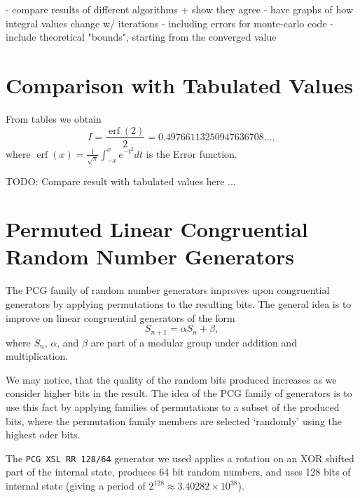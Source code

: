 \documentclass[10pt, a4paper]{article}
\begin{document}
- compare results of different algorithms + show they agree
- have graphs of how integral values change w/ iterations
  - including errors for monte-carlo code
  - include theoretical "bounds", starting from the converged value

{}


\appendix{}

\section{Comparison with Tabulated Values}
\label{app:cheat}
From tables we obtain
\begin{equation}
I = \frac{\operatorname{erf}(2)}{2} = 0.49766113250947636708 \dots,
\end{equation}
where $\operatorname{erf}(x) = \frac{1}{\sqrt\pi}\int_{-x}^x e^{-t^2} dt$ is the Error function.

TODO: Compare result with tabulated values here ...

\section{Permuted Linear Congruential Random Number Generators}
\label{app:pcg}

The PCG family of random number generators improves upon congruential generators by applying
permutations to the resulting bits\cite{pcg}. The general idea is to improve on linear congruential
generators of the form
\begin{equation}
S_{n+1} = \alpha S_n + \beta,
\end{equation}
where $S_n$, $\alpha$, and $\beta$ are part of a modular group under addition and multiplication.

We may notice, that the quality of the random bits produced increases as we consider higher bits
in the result\cite{pcg}. The idea of the PCG family of generators is to use this fact by
applying families of permutations to a subset of the produced bits, where the permutation family
members are selected `randomly' using the highest oder bits.

The \texttt{PCG XSL RR 128/64} generator we used applies a rotation on an XOR shifted part of the
internal state, produces 64 bit random numbers, and uses 128 bits of internal state (giving a
period of $2^{128} \approx 3.40282\times10^{38}$)\cite{pcg}.
\end{document}
